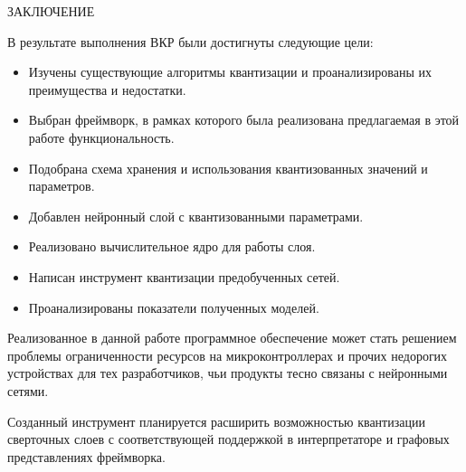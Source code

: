 \Conclusion %

\begin{center}
ЗАКЛЮЧЕНИЕ
\end{center}

В результате выполнения ВКР были достигнуты следующие цели:
\begin{itemize}
    \item Изучены существующие алгоритмы квантизации и проанализированы их преимущества и недостатки.
    \item Выбран фреймворк, в рамках которого была реализована предлагаемая в этой работе функциональность.
    \item Подобрана схема хранения и использования квантизованных значений и параметров.
    \item Добавлен нейронный слой с квантизованными параметрами.
    \item Реализовано вычислительное ядро для работы слоя.
    \item Написан инструмент квантизации предобученных сетей.
    \item Проанализированы показатели полученных моделей.
\end{itemize}


Реализованное в данной работе программное обеспечение может стать решением проблемы ограниченности ресурсов на микроконтроллерах и прочих недорогих устройствах для тех разработчиков, чьи продукты тесно связаны с нейронными сетями. 

Созданный инструмент планируется расширить возможностью квантизации сверточных слоев с соответствующей поддержкой в интерпретаторе и графовых представлениях фреймворка. 